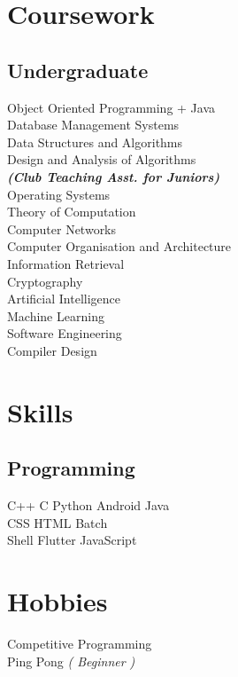 \documentclass[]{deedy-resume-openfont}
\begin{document}
\begin{minipage}[t]{0.33\textwidth}
\section{Coursework}
\subsection{Undergraduate}
Object Oriented Programming + Java \\
Database Management Systems \\
Data Structures and Algorithms \\
Design and Analysis of Algorithms \\
{\footnotesize \textit{\textbf{(Club Teaching Asst. for Juniors) }}} \\
Operating Systems \\
Theory of Computation \\
Computer Networks \\
Computer Organisation and Architecture \\
Information Retrieval \\
Cryptography \\
Artificial Intelligence \\
Machine Learning \\
Software Engineering \\
Compiler Design \\ 
\sectionsep

\section{Skills}
\subsection{Programming}
C++ \textbullet{}   C \textbullet{} Python \textbullet{} Android \textbullet{} Java \\
CSS \textbullet{} HTML \textbullet{} Batch\\
Shell \textbullet{} Flutter \textbullet{} JavaScript \\
\sectionsep

\section{Hobbies}
\textbullet{} Competitive Programming \\
\textbullet{} Ping Pong \textit{( Beginner )} \\
\sectionsep

%
%

\end{minipage} 
\end{document}
